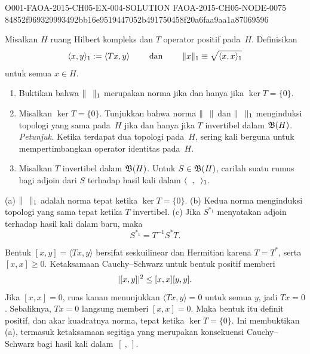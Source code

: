 \begin{o001solution}
  {O001-FAOA-2015-CH05-EX-004-SOLUTION}
  {FAOA-2015-CH05-NODE-0075}
  {84852f969329993492bb16e9519447052b491750458f20a6faa9aa1a87069596}
\begin{o001statement}
Misalkan $H$ ruang Hilbert kompleks dan $T$ operator positif pada~$H$.  Definisikan
   \[ \langle x,y \rangle_1 := \langle Tx,y \rangle \qquad \text{ dan } \qquad \lVert x\rVert_1 \equiv \sqrt{\langle x,x \rangle_1} \]
untuk semua $x \in H$.
 \begin{enumerate}
  \item[(a)] Buktikan bahwa $\norm{\hphantom O}_1$ merupakan norma jika dan hanya jika $\ker T = \{0\}$.
  \item[(b)] Misalkan $\ker T = \{0\}$. Tunjukkan bahwa norma $\norm{\hphantom O}$ dan
$\norm{\hphantom O}_1$ menginduksi topologi yang sama pada~$H$ jika dan hanya jika $T$ invertibel dalam
$\mathfrak{B}(H)$. \emph{Petunjuk.}  Ketika terdapat dua topologi pada~$H$, sering kali berguna untuk
mempertimbangkan operator identitas pada~$H$.
  \item[(c)] Misalkan $T$ invertibel dalam $\mathfrak{B}(H)$.  Untuk $S \in \mathfrak{B}(H)$, carilah suatu rumus bagi
adjoin dari $S$ terhadap hasil kali dalam $\langle \hphantom x , \hphantom y \rangle_1$.
 \end{enumerate}
\end{o001statement}
\begin{o001answer}
(a) $\norm{\hphantom O}_1$ adalah norma tepat ketika $\ker T=\{0\}$.
(b) Kedua norma menginduksi topologi yang sama tepat ketika $T$ invertibel.
(c) Jika $S^{*_1}$ menyatakan adjoin terhadap hasil kali dalam baru, maka
\[
 S^{*_1}=T^{-1}S^*T.
\]
\end{o001answer}
\begin{o001proof}
Bentuk $[x,y]=\langle Tx,y\rangle$ bersifat seskuilinear dan Hermitian
karena $T=T^*$, serta $[x,x]\geq0$. Ketaksamaan Cauchy--Schwarz untuk bentuk
positif memberi
\[
 \lvert[x,y]\rvert^2\leq[x,x][y,y].
\]
Jika $[x,x]=0$, ruas kanan menunjukkan $\langle Tx,y\rangle=0$ untuk semua
$y$, jadi $Tx=0$. Sebaliknya, $Tx=0$ langsung memberi $[x,x]=0$. Maka
bentuk itu definit positif, dan akar kuadratnya norma, tepat ketika
$\ker T=\{0\}$. Ini membuktikan (a), termasuk ketaksamaan segitiga yang
merupakan konsekuensi Cauchy--Schwarz bagi hasil kali dalam~$[\ ,\ ]$.


\end{o001proof}
\end{o001solution}
